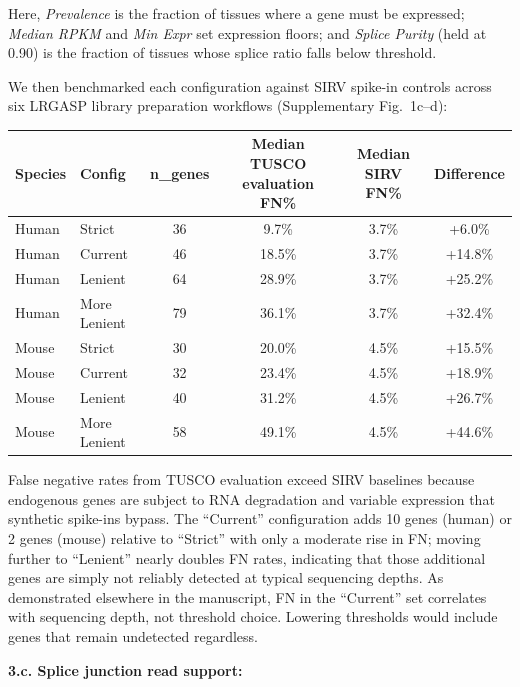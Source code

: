 \documentclass[11pt]{article}
\newcommand{\tuscoEvaluation}{TUSCO evaluation}
\begin{document}
\begin{responseboxnew}
\vspace{0.2cm}
Here, \emph{Prevalence} is the fraction of tissues where a gene must be expressed; \emph{Median RPKM} and \emph{Min Expr} set expression floors; and \emph{Splice Purity} (held at 0.90) is the fraction of tissues whose splice ratio falls below threshold.

We then benchmarked each configuration against SIRV spike-in controls across six LRGASP library preparation workflows (Supplementary Fig.~1c--d):

\vspace{0.2cm}
\begin{center}
\small
\begin{tabular}{llcccc}
\toprule
Species & Config & n\_genes & Median \tuscoEvaluation{} FN\% & Median SIRV FN\% & Difference \\
\midrule
Human & Strict       & 36 & 9.7\%  & 3.7\% & +6.0\% \\
Human & Current      & 46 & 18.5\% & 3.7\% & +14.8\% \\
Human & Lenient      & 64 & 28.9\% & 3.7\% & +25.2\% \\
Human & More Lenient & 79 & 36.1\% & 3.7\% & +32.4\% \\
\midrule
Mouse & Strict       & 30 & 20.0\% & 4.5\% & +15.5\% \\
Mouse & Current      & 32 & 23.4\% & 4.5\% & +18.9\% \\
Mouse & Lenient      & 40 & 31.2\% & 4.5\% & +26.7\% \\
Mouse & More Lenient & 58 & 49.1\% & 4.5\% & +44.6\% \\
\bottomrule
\end{tabular}
\end{center}

\vspace{0.2cm}
False negative rates from TUSCO evaluation exceed SIRV baselines because endogenous genes are subject to RNA degradation and variable expression that synthetic spike-ins bypass. The ``Current'' configuration adds 10 genes (human) or 2 genes (mouse) relative to ``Strict'' with only a moderate rise in FN; moving further to ``Lenient'' nearly doubles FN rates, indicating that those additional genes are simply not reliably detected at typical sequencing depths. As demonstrated elsewhere in the manuscript, FN in the ``Current'' set correlates with sequencing depth, not threshold choice. Lowering thresholds would include genes that remain undetected regardless.

\vspace{0.3cm}
\textbf{3.c. Splice junction read support:}


\end{responseboxnew}
\end{document}
